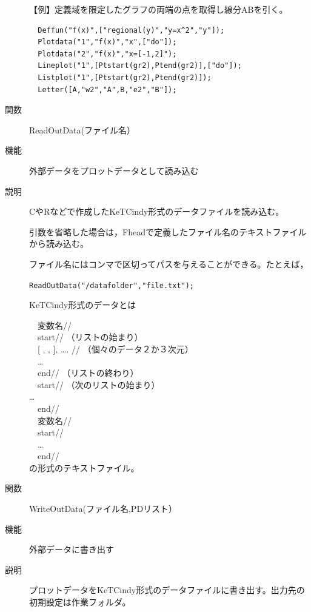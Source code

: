 \documentclass[papersize,a4paper,12pt,uplatex]{jsarticle}
\begin{document}
\begin{description}
\vspace{\baselineskip}
【例】定義域を限定したグラフの両端の点を取得し線分ABを引く。
\begin{verbatim}
  Deffun("f(x)",["regional(y)","y=x^2","y"]); 
  Plotdata("1","f(x)","x",["do"]);
  Plotdata("2","f(x)","x=[-1,2]");
  Lineplot("1",[Ptstart(gr2),Ptend(gr2)],["do"]);
  Listplot("1",[Ptstart(gr2),Ptend(gr2)]);
  Letter([A,"w2","A",B,"e2","B"]);
\end{verbatim}
\begin{center}  \end{center}

\vspace{\baselineskip}
\hypertarget{readoutdata}{}
\item[関数]  ReadOutData(ファイル名）
\item[機能]  外部データをプロットデータとして読み込む
\item[説明]  CやRなどで作成したKeTCindy形式のデータファイルを読み込む。

引数を省略した場合は，Fheadで定義したファイル名のテキストファイルから読み込む。

ファイル名にはコンマで区切ってパスを与えることができる。たとえば，

\verb|ReadOutData("/datafolder","file.txt"); |
      
KeTCindy形式のデータとは

　変数名// \\
　start//  （リストの始まり） \\
　[ , , ], …. // （個々のデータ２か３次元） \\
　… \\
　end// （リストの終わり） \\
　start// （次のリストの始まり） \\
    … \\
　end// \\
　変数名// \\
　start// \\
　… \\
　end// \\

の形式のテキストファイル。

\vspace{\baselineskip}
\hypertarget{writeoutdata}{}
\item[関数]  WriteOutData(ファイル名,PDリスト）
\item[機能]  外部データに書き出す
\item[説明]  プロットデータをKeTCindy形式のデータファイルに書き出す。出力先の 初期設定は作業フォルダ。


\end{description}
\end{document}
